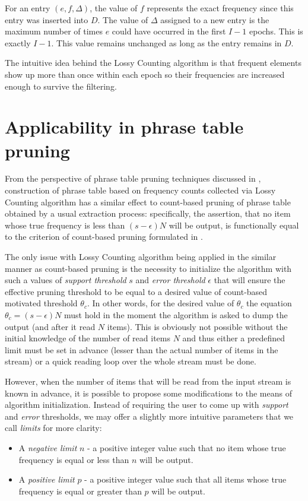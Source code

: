 For an entry $(e, f, \Delta)$, the value of $f$ represents the exact frequency
since this entry was inserted into $D$.
The value of $\Delta$ assigned to a new entry is the maximum number of times
$e$ could have occurred in the first $I-1$ epochs. This is exactly $I-1$.
This value remains unchanged as long as the entry remains in $D$.

The intuitive idea behind the Lossy Counting algorithm is that frequent elements
show up more than once within each epoch so their frequencies are increased enough
to survive the filtering.

\section{Applicability in phrase table pruning}

From the perspective of phrase table pruning techniques discussed in
, construction of phrase table based on frequency counts
collected via Lossy Counting algorithm has a similar effect to count-based pruning of
phrase table obtained by a usual extraction process:
specifically, the assertion, that no item whose true frequency is less than
$(s - \epsilon)N$ will be output, is functionally equal to the criterion of
count-based pruning formulated in .

The only issue with Lossy Counting algorithm being applied in the similar manner as
count-based pruning is the necessity to initialize the algorithm with such a values of
\emph{support threshold} $s$ and \emph{error threshold} $\epsilon$ that will ensure
the effective pruning threshold to be equal to a desired value of count-based
motivated threshold $\theta_{c}$.
In other words, for the desired value of $\theta_{c}$ the equation $\theta_{c} = (s - \epsilon)N$
must hold in the moment the algorithm is asked to dump the output (and after it read $N$ items).
This is obviously not possible without the initial knowledge of the number of read
items $N$ and thus either a predefined limit must be set in advance (lesser than
the actual number of items in the stream) or a quick reading loop over the whole stream
must be done.

However, when the number of items that will be read from the input stream is known
in advance, it is possible to propose some modifications to the means of algorithm
initialization.
Instead of requiring the user to come up with \emph{support} and \emph{error} thresholds,
we may offer a slightly more intuitive parameters that we call \emph{limits} for more clarity:
\begin{itemize}
  \item A \emph{negative limit} $n$ - a positive integer value such that no item
    whose true frequency is equal or less than $n$ will be output.
  \item A \emph{positive limit} $p$ - a positive integer value such that all items
    whose true frequency is equal or greater than $p$ will be output.
\end{itemize}

